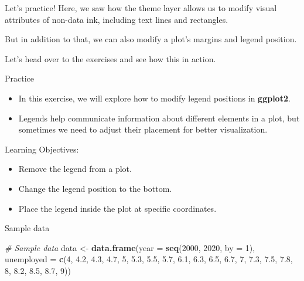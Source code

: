 \documentclass[
  ignorenonframetext,
]{beamer}
\newenvironment{Shaded}{\begin{snugshade}}{\end{snugshade}}
\newcommand{\AttributeTok}[1]{\textcolor[rgb]{0.13,0.29,0.53}{#1}}
\newcommand{\CommentTok}[1]{\textcolor[rgb]{0.56,0.35,0.01}{\textit{#1}}}
\newcommand{\DecValTok}[1]{\textcolor[rgb]{0.00,0.00,0.81}{#1}}
\newcommand{\FloatTok}[1]{\textcolor[rgb]{0.00,0.00,0.81}{#1}}
\newcommand{\FunctionTok}[1]{\textcolor[rgb]{0.13,0.29,0.53}{\textbf{#1}}}
\newcommand{\NormalTok}[1]{#1}
\newcommand{\OtherTok}[1]{\textcolor[rgb]{0.56,0.35,0.01}{#1}}
\providecommand{\tightlist}{%
  \setlength{\itemsep}{0pt}\setlength{\parskip}{0pt}}
\begin{document}
\begin{frame}{Let's practice!}
\label{lets-practice}
Here, we saw how the theme layer allows us to modify visual attributes
of non-data ink, including text lines and rectangles.

But in addition to that, we can also modify a plot's margins and legend
position.

Let's head over to the exercises and see how this in action.
\end{frame}

\begin{frame}{Practice}
\label{practice}
\begin{itemize}
\tightlist
\item
  In this exercise, we will explore how to modify legend positions in
  \textbf{ggplot2}.\\
\item
  Legends help communicate information about different elements in a
  plot, but sometimes we need to adjust their placement for better
  visualization.
\end{itemize}
\end{frame}

\begin{frame}{Learning Objectives:}
\label{learning-objectives}
\begin{itemize}
\tightlist
\item
  Remove the legend from a plot.
\item
  Change the legend position to the bottom.
\item
  Place the legend inside the plot at specific coordinates.
\end{itemize}
\end{frame}

\begin{frame}[fragile]{Sample data}
\label{sample-data}

\begin{Shaded}
\begin{Highlighting}[]
\CommentTok{\# Sample data}
\NormalTok{data }\OtherTok{\textless{}{-}} \FunctionTok{data.frame}\NormalTok{(}\AttributeTok{year =} \FunctionTok{seq}\NormalTok{(}\DecValTok{2000}\NormalTok{, }\DecValTok{2020}\NormalTok{, }\AttributeTok{by =} \DecValTok{1}\NormalTok{), }\AttributeTok{unemployed =} \FunctionTok{c}\NormalTok{(}\DecValTok{4}\NormalTok{,}
    \FloatTok{4.2}\NormalTok{, }\FloatTok{4.3}\NormalTok{, }\FloatTok{4.7}\NormalTok{, }\DecValTok{5}\NormalTok{, }\FloatTok{5.3}\NormalTok{, }\FloatTok{5.5}\NormalTok{, }\FloatTok{5.7}\NormalTok{, }\FloatTok{6.1}\NormalTok{, }\FloatTok{6.3}\NormalTok{, }\FloatTok{6.5}\NormalTok{, }\FloatTok{6.7}\NormalTok{, }\DecValTok{7}\NormalTok{, }\FloatTok{7.3}\NormalTok{,}
    \FloatTok{7.5}\NormalTok{, }\FloatTok{7.8}\NormalTok{, }\DecValTok{8}\NormalTok{, }\FloatTok{8.2}\NormalTok{, }\FloatTok{8.5}\NormalTok{, }\FloatTok{8.7}\NormalTok{, }\DecValTok{9}\NormalTok{))}
\end{Highlighting}
\end{Shaded}
\end{frame}
\end{document}
